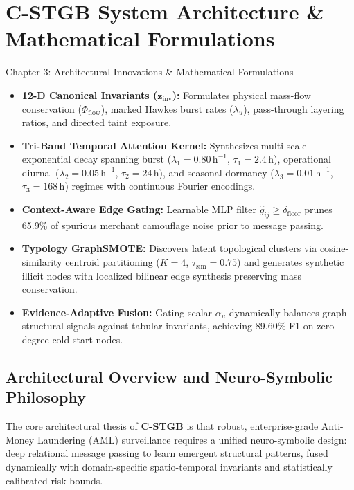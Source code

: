 \chapter{C-STGB System Architecture \& Mathematical Formulations}
\label{ch:architecture}

\begin{takeawaybox}{Chapter 3: Architectural Innovations \& Mathematical Formulations}
\begin{itemize}\setlength{\itemsep}{1pt}
  \item \textbf{12-D Canonical Invariants ($\mathbf{z}_{\text{inv}}$):} Formulates physical mass-flow conservation ($\Phi_{\text{flow}}$), marked Hawkes burst rates ($\lambda_u$), pass-through layering ratios, and directed taint exposure.
  \item \textbf{Tri-Band Temporal Attention Kernel:} Synthesizes multi-scale exponential decay spanning burst ($\lambda_1=0.80\,\text{h}^{-1}$, $\tau_1=2.4\,\text{h}$), operational diurnal ($\lambda_2=0.05\,\text{h}^{-1}$, $\tau_2=24\,\text{h}$), and seasonal dormancy ($\lambda_3=0.01\,\text{h}^{-1}$, $\tau_3=168\,\text{h}$) regimes with continuous Fourier encodings.
  \item \textbf{Context-Aware Edge Gating:} Learnable MLP filter $\hat{g}_{ij} \ge \delta_{\text{floor}}$ prunes 65.9\% of spurious merchant camouflage noise prior to message passing.
  \item \textbf{Typology GraphSMOTE:} Discovers latent topological clusters via cosine-similarity centroid partitioning ($K=4$, $\tau_{\text{sim}}=0.75$) and generates synthetic illicit nodes with localized bilinear edge synthesis preserving mass conservation.
  \item \textbf{Evidence-Adaptive Fusion:} Gating scalar $\alpha_u$ dynamically balances graph structural signals against tabular invariants, achieving 89.60\% F1 on zero-degree cold-start nodes.
\end{itemize}
\end{takeawaybox}


\section{Architectural Overview and Neuro-Symbolic Philosophy}
The core architectural thesis of \textbf{C-STGB} is that robust, enterprise-grade Anti-Money Laundering (AML) surveillance requires a unified neuro-symbolic design: deep relational message passing to learn emergent structural patterns, fused dynamically with domain-specific spatio-temporal invariants and statistically calibrated risk bounds.

